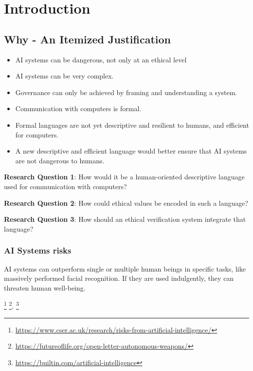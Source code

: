\chapter{Introduction}

\newcommand{\question}[1]{\textit{#1}}

\newcommand{\comment}[1]{{#1}}


\section{Why - An Itemized Justification}

\begin{itemize}
    \item AI systems can be dangerous, not only at an ethical level
    \item AI systems can be very complex.
    \item Governance can only be achieved by framing and understanding a system.~\cite{doi:10.1145/3278721.3278745}
    \item Communication with computers is formal.
    \item Formal languages are not yet descriptive and resilient to humans, and efficient for computers.
    \item A new descriptive and efficient language would better ensure that AI systems are not dangerous to humans.
\end{itemize}



\textbf{Research Question 1}: How would it be a human-oriented descriptive language used for communication with computers?


\textbf{Research Question 2}: How could ethical values be encoded in such a language?


\textbf{Research Question 3}: How should an ethical verification system integrate that language?

\subsection{AI Systems risks}

AI systems can outperform single or multiple human beings in specific tasks, like massively performed facial recognition.
If they are used indulgently, they can threaten human well-being.

\footnote{\url{https://www.cser.ac.uk/research/risks-from-artificial-intelligence/}}
\footnote{\url{https://futureoflife.org/open-letter-autonomous-weapons/}}.
\footnote{\url{https://builtin.com/artificial-intelligence}}

